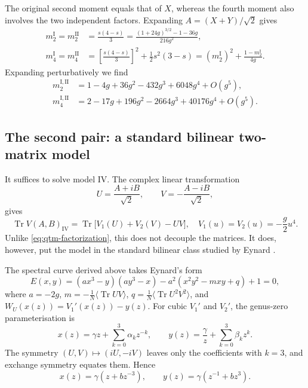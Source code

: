 The original second moment equals that of $X$, whereas the fourth moment also involves the two
independent factors. Expanding $A=(X+Y)/\sqrt2$ gives
\begin{align}
    m_2^{\mathrm I}=m_2^{\mathrm{II}}
     & =\frac{s(4-s)}3
    =\frac{(1+24g)^{3/2}-1-36g}{216g^2},\label{eq:qtm-first-m2} \\
    m_4^{\mathrm I}=m_4^{\mathrm{II}}
     & =\left[\frac{s(4-s)}3\right]^2+\frac12s^2(3-s)
    =(m_2^{\mathrm I})^2+\frac{1-m_2^{\mathrm I}}{4g}.
    \label{eq:qtm-first-m4}
\end{align}
Expanding perturbatively we find
\begin{align}
    m_2^{\mathrm I,\mathrm{II}}
     & =1-4g+36g^2-432g^3+6048g^4+O(g^5), \\
    m_4^{\mathrm I,\mathrm{II}}
     & =2-17g+196g^2-2664g^3+40176g^4+O(g^5).
    \label{eq:qtm-first-series}
\end{align}

\subsection{The second pair: a standard bilinear two-matrix model}

It suffices to solve model IV. The complex linear transformation
\begin{equation}
    U=\frac{A+iB}{\sqrt2},\qquad
    V=-\frac{A-iB}{\sqrt2},
    \label{eq:qtm-complex-basis}
\end{equation}
gives
\begin{equation}
    \operatorname{Tr} V(A,B)_{\mathrm{IV}}
    =\operatorname{Tr}\bigl[V_1(U)+V_2(V)-UV\bigr],
    \quad V_1(u)=V_2(u)=-\frac g2u^4.
    \label{eq:qtm-bilinear}
\end{equation}
Unlike \eqref{eq:qtm-factorization}, this does not decouple the matrices. It does, however, put the
model in the standard bilinear class studied by Eynard \cite{Eynard:2002kg}.

The spectral curve derived above takes Eynard's form
\begin{equation}
    E(x,y)=(ax^3-y)(ay^3-x)
    -a^2(x^2y^2-mxy+q)+1=0,
    \label{eq:qtm-second-curve}
\end{equation}%
where $a=-2g$, $m=-\frac1N\bigl\langle\operatorname{Tr}UV\bigr\rangle$,
$q=\frac1N\bigl\langle\operatorname{Tr}U^2V^2\bigr\rangle$, and $W_U(x(z))=V_1'(x(z))-y(z)$. For
cubic $V_1'$ and $V_2'$, the genus-zero parameterisation is
\begin{equation}
    x(z)=\gamma z+\sum_{k=0}^3\alpha_kz^{-k},\qquad
    y(z)=\frac\gamma z+\sum_{k=0}^3\beta_kz^k.
    \label{eq:qtm-general-rational}
\end{equation}%
The symmetry $(U,V)\mapsto(iU,-iV)$ leaves only the coefficients with $k=3$, and exchange symmetry
equates them. Hence
\begin{equation}
    x(z)=\gamma(z+bz^{-3}),\qquad
    y(z)=\gamma(z^{-1}+bz^3).
    \label{eq:qtm-rational}
\end{equation}%

